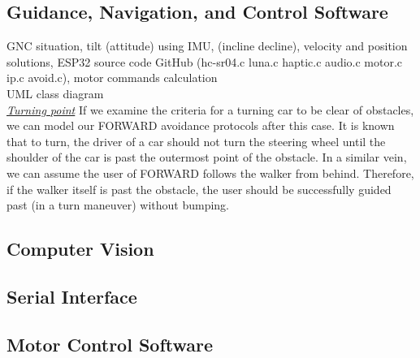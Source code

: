 \subsection{Guidance, Navigation, and Control Software}
\noindent GNC situation, tilt (attitude) using IMU, (incline decline), velocity and position solutions, ESP32 source code GitHub (hc-sr04.c luna.c haptic.c audio.c motor.c ip.c avoid.c), motor commands calculation\\

\noindent UML class diagram\\

\noindent \underline{\textit{Turning point}} If we examine the criteria for a turning car to be clear of obstacles, we can model our FORWARD avoidance protocols after this case. It is known that to turn, the driver of a car should not turn the steering wheel until the shoulder of the car is past the outermost point of the obstacle. In a similar vein, we can assume the user of FORWARD follows the walker from behind. Therefore, if the walker itself is past the obstacle, the user should be successfully guided past (in a turn maneuver) without bumping.\\

\subsection{Computer Vision}

\subsection{Serial Interface}

\subsection{Motor Control Software}
